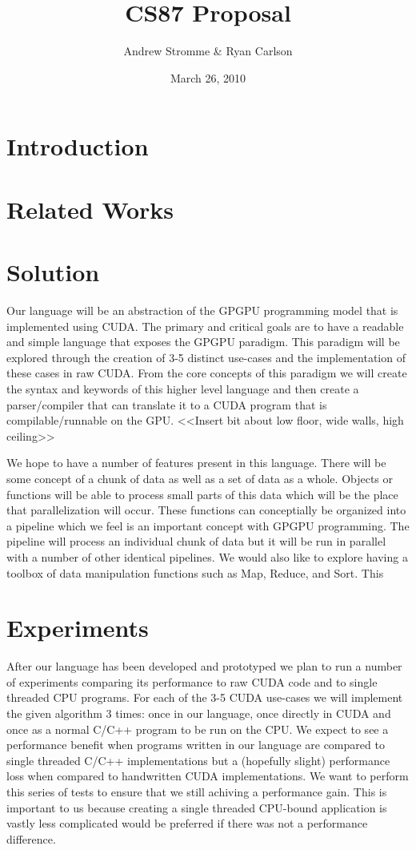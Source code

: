 \documentclass{article}
\begin{document}
\title{CS87 Proposal}
\author{Andrew Stromme \& Ryan Carlson}
\date{March 26, 2010}
\maketitle

\section{Introduction}

\section{Related Works}

\section{Solution}
Our language will be an abstraction of the GPGPU programming model that is implemented using CUDA. The primary and critical goals are to have a readable and simple language that exposes the GPGPU paradigm. This paradigm will be explored through the creation of 3-5 distinct use-cases and the implementation of these cases in raw CUDA. From the core concepts of this paradigm we will create the syntax and keywords of this higher level language and then create a parser/compiler that can translate it to a CUDA program that is compilable/runnable on the GPU. <<Insert bit about low floor, wide walls, high ceiling>>

We hope to have a number of features present in this language. There will be some concept of a chunk of data as well as a set of data as a whole. Objects or functions will be able to process small parts of this data which will be the place that parallelization will occur. These functions can conceptially be organized into a pipeline which we feel is an important concept with GPGPU programming. The pipeline will process an individual chunk of data but it will be run in parallel with a number of other identical pipelines. We would also like to explore having a toolbox of data manipulation functions such as Map, Reduce, and Sort. This 


\section{Experiments}
After our language has been developed and prototyped we plan to run a number of experiments comparing its performance to raw CUDA code and to single threaded CPU programs. For each of the 3-5 CUDA use-cases we will implement the given algorithm 3 times: once in our language, once directly in CUDA and once as a normal C/C++ program to be run on the CPU. We expect to see a performance benefit when programs written in our language are compared to single threaded C/C++ implementations but a (hopefully slight) performance loss when compared to handwritten CUDA implementations. We want to perform this series of tests to ensure that we still achiving a performance gain. This is important to us because creating a single threaded CPU-bound application is vastly less complicated would be preferred if there was not a performance difference.
\end{document}
